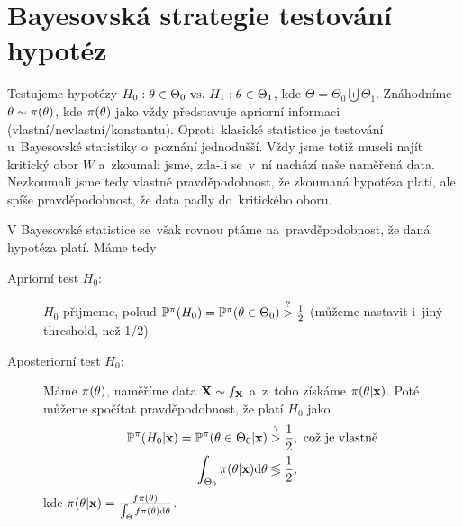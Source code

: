 \chapter{Bayesovská strategie testování hypotéz}
Testujeme hypotézy $H_0: \theta\in\Theta_0 ~\text{vs.}~ H_1: \theta\in\Theta_1$, kde $\Theta
=\Theta_0 \biguplus \Theta_1$. Znáhodníme $\theta\sim\pi(\theta)$, kde $\pi(\theta)$ jako vždy představuje apriorní informaci (vlastní/nevlastní/konstantu). Oproti~klasické statistice je testování u~Bayesovské statistiky o~poznání jednodušší. Vždy jsme totiž museli najít kritický obor $W$ a~zkoumali jsme, zda-li se~v~ní nachází naše naměřená data. Nezkoumali jsme tedy vlastně pravděpodobnost, že zkoumaná hypotéza platí, ale spíše pravděpodobnost, že data padly do~kritického oboru. 

V Bayesovské statistice se~však rovnou ptáme na~pravděpodobnost, že daná hypotéza platí. Máme tedy
\begin{description}
	\item[Apriorní test $H_0$:] $H_0$ přijmeme, pokud $\mathbb{P}^\pi(H_0)=\mathbb{P}^\pi(\theta\in\Theta_0)\stackrel{?}{>}\frac{1}{2}$ (můžeme nastavit i~jiný threshold, než 1/2).
	\item[Aposteriorní test $H_0$:] Máme $\pi(\theta)$, naměříme data $\textbf{X}\sim f_{\textbf{X}}$ a~z~toho získáme $\pi(\theta|\textbf{x})$. Poté můžeme spočítat pravděpodobnost, že platí $H_0$ jako
	\[
	\begin{split}
	\mathbb{P}^\pi(H_0|\textbf{x})=\mathbb{P}^\pi(\theta\in\Theta_0|\textbf{x})&\stackrel{?}{>}\frac{1}{2}, \text{ což je vlastně}\\
	\int_{\Theta_0}\pi(\theta|\textbf{x})\mathrm{d}\theta & \lessgtr \frac{1}{2},
	\end{split}
	\]
	kde $\pi(\theta|\textbf{x})= \frac{f\pi(\theta)}{\int_\Theta f\pi(\theta)\mathrm{d}\theta}$.
\end{description}


